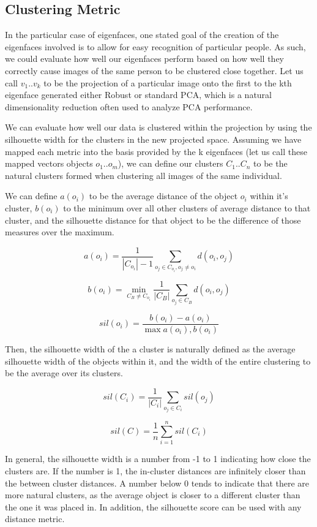 \documentclass[11pt]{scrartcl} %
\theoremstyle{plain}
\begin{document}
\subsection{Clustering Metric}

In the particular case of eigenfaces, one stated goal of the creation of the eigenfaces involved is to allow for easy recognition of particular people. As such, we could evaluate how well our eigenfaces perform based on how well they correctly cause images of the same person to be clustered close together. Let us call $v_1 .. v_k$ to be the projection of a particular image onto the first to the kth eigenface generated either Robust or standard PCA, which is a natural dimensionality reduction often used to analyze PCA performance.

We can evaluate how well our data is clustered within the projection by using the silhouette width\cite{silhouette} for the clusters in the new projected space. Assuming we have mapped each metric into the basis provided by the k eigenfaces (let us call these mapped vectors objects $o_1 .. o_m$), we can define our clusters $C_1 .. C_n$ to be the natural clusters formed when clustering all images of the same individual.

We can define $a(o_i)$ to be the average distance of the object $o_i$ within it's cluster, $b(o_i)$ to the minimum over all other clusters of average distance to that cluster, and the silhouette distance for that object to be the difference of those measures over the maximum.

\[
a(o_i) = \frac{1}{|C_{o_i}| - 1} \sum_{o_j \in C_{o_i}, o_j \ne o_i} d(o_i, o_j)
\]

\[
b(o_i) = \min_{C_B \ne C_{o_i}} \frac{1}{|C_B|} \sum_{o_j \in C_B} d(o_i, o_j)
\]

\[
sil(o_i) = \frac{b(o_i) - a(o_i)}{\max{a(o_i), b(o_i)}}
\]

Then, the silhouette width of the a cluster is naturally defined as the average silhouette width of the objects within it, and the width of the entire clustering to be the average over its clusters.
 
\[
sil(C_i) = \frac{1}{|C_i|}\sum_{o_j \in C_i} sil(o_j)
\]

\[
sil(C) = \frac{1}{n}\sum_{i = 1}^{n} sil(C_i)
\]

In general, the silhouette width is a number from -1 to 1 indicating how close the clusters are. If the number is 1, the in-cluster distances are infinitely closer than the between cluster distances. A number below 0 tends to indicate that there are more natural clusters, as the average object is closer to a different cluster than the one it was placed in. In addition, the silhouette score can be used with any distance metric.
\end{document}
